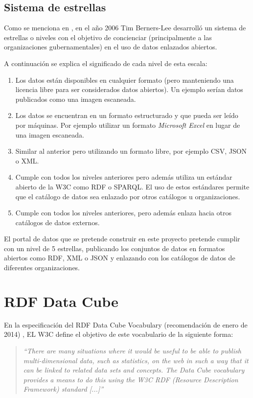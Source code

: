 \subsection{Sistema de estrellas}
Como se menciona en \cite{tbl-linkedopendata}, en el año 2006 Tim Berners-Lee desarrolló un sistema de estrellas o niveles con el objetivo de concienciar (principalmente a las organizaciones gubernamentales) en el uso de datos enlazados abiertos.

A continuación se explica el significado de cada nivel de esta escala:
\begin{enumerate}
    \item Los datos están disponibles en cualquier formato (pero manteniendo una licencia libre para ser considerados datos abiertos).  Un ejemplo serían datos publicados como una imagen escaneada.
    \item Los datos se encuentran en un formato estructurado y que pueda ser leído por máquinas.  Por ejemplo utilizar un formato \textit{Microsoft Excel} en lugar de una imagen escaneada.
    \item Similar al anterior pero utilizando un formato libre, por ejemplo CSV, JSON o XML.
    \item Cumple con todos los niveles anteriores pero además utiliza un estándar abierto de la W3C como RDF o SPARQL.  El uso de estos estándares permite que el catálogo de datos sea enlazado por otros catálogos u organizaciones.
    \item Cumple con todos los niveles anteriores, pero además enlaza hacia otros catálogos de datos externos.
\end{enumerate}

El portal de datos que se pretende construir en este proyecto pretende cumplir con un nivel de 5 estrellas, publicando los conjuntos de datos en formatos abiertos como RDF, XML o JSON y enlazando con los catálogos de datos de diferentes organizaciones.



\section{RDF Data Cube}
\label{concept:rdf_data_cube}
En la especificación del RDF Data Cube Vocabulary (recomendación de enero de 2014) \cite{w3c:data-cube}, EL W3C define el objetivo de este vocabulario de la siguiente forma:
\begin{quote}
\textit{``There are many situations where it would be useful to be able to publish multi-dimensional data, such as statistics, on the web in such a way that it can be linked to related data sets and concepts. The Data Cube vocabulary provides a means to do this using the W3C RDF (Resource Description Framework) standard [...]''}
\end{quote}

